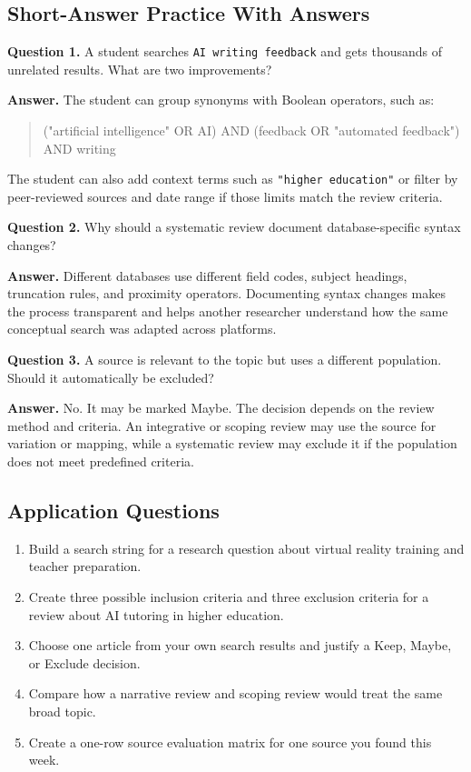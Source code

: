 \documentclass[11pt,letterpaper]{article}
\newcommand{\searchstring}[1]{
  \begin{quote}
  \small\ttfamily\raggedright #1\par
  \end{quote}
}
\begin{document}
\subsection{Short-Answer Practice With Answers}

\textbf{Question 1.} A student searches \texttt{AI writing feedback} and gets thousands of unrelated results. What are two improvements?

\textbf{Answer.} The student can group synonyms with Boolean operators, such as:
\searchstring{("artificial intelligence" OR AI) AND (feedback OR "automated feedback") AND writing}
The student can also add context terms such as \texttt{"higher education"} or filter by peer-reviewed sources and date range if those limits match the review criteria.

\textbf{Question 2.} Why should a systematic review document database-specific syntax changes?

\textbf{Answer.} Different databases use different field codes, subject headings, truncation rules, and proximity operators. Documenting syntax changes makes the process transparent and helps another researcher understand how the same conceptual search was adapted across platforms.

\textbf{Question 3.} A source is relevant to the topic but uses a different population. Should it automatically be excluded?

\textbf{Answer.} No. It may be marked Maybe. The decision depends on the review method and criteria. An integrative or scoping review may use the source for variation or mapping, while a systematic review may exclude it if the population does not meet predefined criteria.

\subsection{Application Questions}

\begin{enumerate}
  \item Build a search string for a research question about virtual reality training and teacher preparation.
  \item Create three possible inclusion criteria and three exclusion criteria for a review about AI tutoring in higher education.
  \item Choose one article from your own search results and justify a Keep, Maybe, or Exclude decision.
  \item Compare how a narrative review and scoping review would treat the same broad topic.
  \item Create a one-row source evaluation matrix for one source you found this week.
\end{enumerate}
\end{document}
